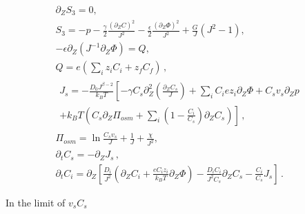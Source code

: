 \begin{gather}
\partial_Z S_3 = 0,\\
S_3 = -p - \frac{\gamma}{2} \frac{(\partial_Z C)^2}{J^2} - \frac{\epsilon}{2} \frac{(\partial_Z \Phi)^2}{J^2}+ \frac{G}{J}\left(J^2-1\right),\\[2mm]
-\epsilon \partial_Z \left(J^{-1} \partial_Z \Phi\right)= Q,\\[2mm]
Q= e\left(\sum\limits_{i} z_i C_i + z_fC_f\right)\, ,\\[2mm]
\begin{aligned}
J_s=-\frac{D_0J^{\beta-2}}{k_B T}\left[ - \gamma C_s \partial^2_Z  \left(\frac{\partial_Z C_s}{J}\right)+\sum_i C_i e z_i \partial_Z \Phi+ C_s v_s\partial_Z p\right.\\[2mm]
\left.+ k_B T \left(C_s \partial_Z \Pi_{osm} + \sum_i \left(1-\frac{C_i}{C_s}\right) \partial_Z C_s \right)\right]\, ,
\end{aligned}\\[2mm]
\Pi_{osm}=\ln \frac{C_s v_s}{J} + \frac{1}{J}+\frac{\chi}{J^2},\\[2mm]
\partial_t C_s = -\partial_Z J_s\,,\\[2mm]
\partial_t C_i = \partial_Z \left[\frac{D_i}{J^2}\left(\partial_Z C_i +\frac{eC_iz_i}{k_B T} \partial_Z \Phi\right)-\frac{D_i C_i}{J^2C_s}\partial_Z C_s-\frac{C_i}{C_s}J_s\right]\, .
\end{gather}
 
In the limit of $v_sC_s$
 